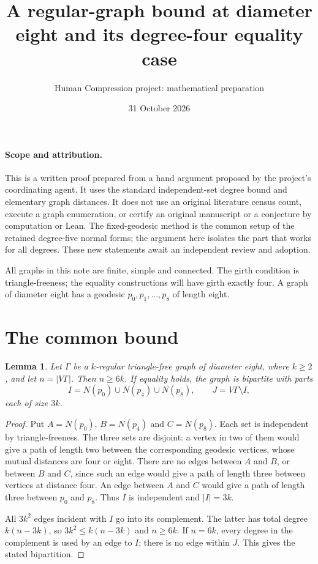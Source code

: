 \documentclass[11pt]{article}
\title{A regular-graph bound at diameter eight and its degree-four equality case}
\author{Human Compression project: mathematical preparation}
\date{31 October 2026}
\newtheorem{lemma}[theorem]{Lemma}
\begin{document}
\maketitle

\paragraph{Scope and attribution.}
This is a written proof prepared from a hand argument proposed by the
project's coordinating agent. It uses the standard independent-set
degree bound and elementary graph distances. It does not use an original
literature census count, execute a graph enumeration, or certify an
original manuscript or a conjecture by computation or Lean. The
fixed-geodesic method is the common setup of the retained degree-five
normal forms; the argument here isolates the part that works for all
degrees. These new statements await an independent review and adoption.

All graphs in this note are finite, simple and connected. The girth
condition is triangle-freeness; the equality constructions will have
girth exactly four. A graph of diameter eight has a geodesic
$p_0,p_1,\ldots,p_8$ of length eight.

\section{The common bound}

\begin{lemma}\label{independent}
Let $\Gamma$ be a $k$-regular triangle-free graph of diameter eight,
where $k\geq2$, and let $n=|V\Gamma|$. Then $n\geq6k$.
If equality holds, the graph is bipartite with parts
\[
 I=N(p_0)\cup N(p_4)\cup N(p_8),\qquad J=V\Gamma\setminus I,
\]
each of size $3k$.
\end{lemma}
\begin{proof}
Put $A=N(p_0)$, $B=N(p_4)$ and $C=N(p_8)$. Each set is independent
by triangle-freeness. The three sets are disjoint: a vertex in two of
them would give a path of length two between the corresponding
geodesic vertices, whose mutual distances are four or eight. There
are no edges between $A$ and $B$, or between $B$ and $C$, since such
an edge would give a path of length three between vertices at distance
four. An edge between $A$ and $C$ would give a path of length three
between $p_0$ and $p_8$. Thus $I$ is independent and $|I|=3k$.

All $3k^2$ edges incident with $I$ go into its complement. The latter
has total degree $k(n-3k)$, so $3k^2\leq k(n-3k)$ and $n\geq6k$.
If $n=6k$, every degree in the complement is used by an edge to $I$;
there is no edge within $J$. This gives the stated bipartition.
\end{proof}
\end{document}
